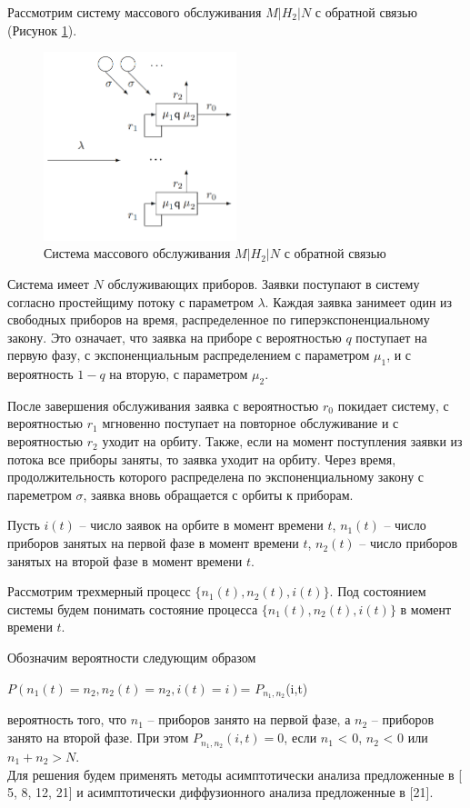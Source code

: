 Рассмотрим систему массового обслуживания $M|H_{2}|N$ с обратной связью (Рисунок \ref{fig:systemN}).

\begin{figure}[htbp]
	\centering
	\includegraphics[width=0.5\textwidth]{systemN}
	\caption{Система массового обслуживания $M|H_{2}|N$ с обратной связью}
	\label{fig:systemN}
\end{figure}


Система имеет $N$ обслуживающих приборов. Заявки поступают в систему согласно простейщиму потоку с параметром $\lambda$. Каждая заявка занимеет один из свободных приборов на время, распределенное по гиперэкспоненциальному закону. Это означает, что заявка на приборе с вероятностью $q$ поступает на первую фазу, с экспоненциальным распределением с параметром $\mu_{1}$, и с вероятность $1-q$ на вторую, с параметром $\mu_{2}$.

После завершения обслуживания заявка с вероятностью $r_{0}$ покидает систему, с вероятностью $r_{1}$ мгновенно поступает на повторное обслуживание и с вероятностью $r_{2}$ уходит на орбиту. Также, если на момент поступления заявки из потока все приборы заняты, то заявка уходит на орбиту. Через время, продолжительность которого распределена по экспоненциальному закону с пареметром $\sigma$, заявка вновь обращается с орбиты к приборам.

Пусть $i(t)$ -- число заявок на орбите в момент времени $t$, 
$n_{1}(t)$ -- число приборов занятых на первой фазе в момент времени $t$,
$n_{2}(t)$ -- число приборов занятых на второй фазе в момент времени $t$.

Рассмотрим трехмерный процесс $\{n_{1}(t), n_{2}(t), i(t)\}$. Под состоянием системы будем понимать состояние процесса $\{n_{1}(t), n_{2}(t), i(t)\}$ в момент времени $t$.

 Обозначим вероятности следующим образом \\
 \begin{center}
 	$P(n_{1}(t) = n_{2}, n_{2}(t)=n_{2}, i(t)=i)$= $P_{n_{1},n_{2}}$(i,t)\\
 \end{center}
вероятность того, что $n_{1}$ -- приборов занято на первой фазе, а $n_{2}$ -- приборов занято на второй фазе. При этом  $P_{n_{1},n_{2}}(i,t)=0$, если $n_{1}$ < 0, $n_{2}$ < 0 или $n_{1}+n_{2} > N.$\\

Для решения будем применять методы асимптотически анализа предложенные в [ 5, 8, 12, 21] и асимптотически диффузионного анализа предложенные в [21].

